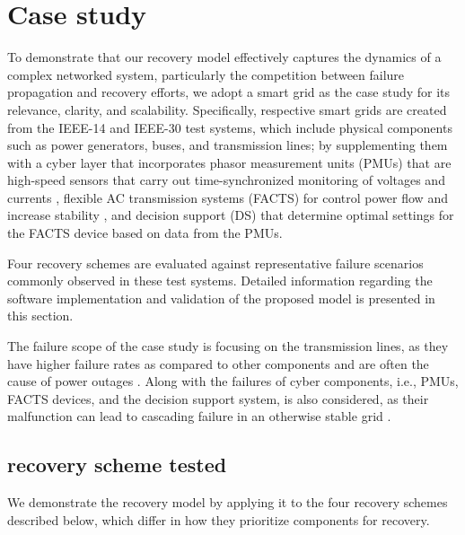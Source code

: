 \documentclass[conference]{IEEEtran}
\begin{document}
\section{Case study}
To demonstrate that our recovery model effectively captures the dynamics of a complex networked system, particularly the competition between failure propagation and recovery efforts, we adopt a smart grid as the case study for its relevance, clarity, and scalability. Specifically, respective smart grids are created from the IEEE-14 and IEEE-30 test systems, which include physical components such as power generators, buses, and transmission lines; by supplementing them with a cyber layer that incorporates phasor measurement units (PMUs) that are high-speed sensors that carry out time-synchronized monitoring of voltages and currents \cite{asprou_optimal_2011}, flexible AC transmission systems (FACTS) for control power flow and increase stability \cite{sosnina_assessment_2022, garrido_location_2019}, and  decision support (DS) that determine optimal settings for the FACTS device based on data from the PMUs. 

Four recovery schemes are evaluated against representative failure scenarios commonly observed in these test systems. Detailed information regarding the software implementation and validation of the proposed model is presented in this section.

The failure scope of the case study is focusing on the transmission lines, as they have higher failure rates as compared to other components and are often the cause of power outages \cite{song_survey_2013}. Along with the failures of cyber components, i.e., PMUs, FACTS devices, and the decision support system, is also considered, as their malfunction can lead to cascading failure in an otherwise stable grid \cite{redacted2}. 

\subsection{recovery scheme tested}
We demonstrate the recovery model by applying it to the four recovery  schemes described below, which differ in how they prioritize components for recovery. 
\end{document}
